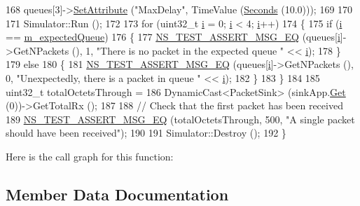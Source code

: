 \begin{DoxyCode}
168   queues[3]->\hyperlink{classns3_1_1ObjectBase_ac60245d3ea4123bbc9b1d391f1f6592f}{SetAttribute} (\textcolor{stringliteral}{"MaxDelay"}, TimeValue (\hyperlink{group__timecivil_ga33c34b816f8ff6628e33d5c8e9713b9e}{Seconds} (10.0)));
169 
170 
171   Simulator::Run ();
172 
173   \textcolor{keywordflow}{for} (uint32\_t \hyperlink{bernuolliDistribution_8m_a6f6ccfcf58b31cb6412107d9d5281426}{i} = 0; \hyperlink{bernuolliDistribution_8m_a6f6ccfcf58b31cb6412107d9d5281426}{i} < 4; \hyperlink{bernuolliDistribution_8m_a6f6ccfcf58b31cb6412107d9d5281426}{i}++)
174     \{
175       \textcolor{keywordflow}{if} (\hyperlink{bernuolliDistribution_8m_a6f6ccfcf58b31cb6412107d9d5281426}{i} == \hyperlink{classWifiAcMappingTest_a8f3ed274153f2ff1568b9fedb07a1185}{m\_expectedQueue})
176         \{
177           \hyperlink{group__testing_ga2a9d78cffb3db8e867c35fff0b698cf5}{NS\_TEST\_ASSERT\_MSG\_EQ} (queues[\hyperlink{bernuolliDistribution_8m_a6f6ccfcf58b31cb6412107d9d5281426}{i}]->GetNPackets (), 1, \textcolor{stringliteral}{"There is no packet in
       the expected queue "} << \hyperlink{bernuolliDistribution_8m_a6f6ccfcf58b31cb6412107d9d5281426}{i});
178         \}
179       \textcolor{keywordflow}{else}
180         \{
181           \hyperlink{group__testing_ga2a9d78cffb3db8e867c35fff0b698cf5}{NS\_TEST\_ASSERT\_MSG\_EQ} (queues[\hyperlink{bernuolliDistribution_8m_a6f6ccfcf58b31cb6412107d9d5281426}{i}]->GetNPackets (), 0, \textcolor{stringliteral}{"Unexpectedly, there
       is a packet in queue "} << \hyperlink{bernuolliDistribution_8m_a6f6ccfcf58b31cb6412107d9d5281426}{i});
182         \}
183     \}
184 
185   uint32\_t totalOctetsThrough =
186     DynamicCast<PacketSink> (sinkApp.\hyperlink{classns3_1_1ApplicationContainer_a9e565807abd4213a56566a7ccd8d7509}{Get} (0))->GetTotalRx ();
187 
188   \textcolor{comment}{// Check that the first packet has been received}
189   \hyperlink{group__testing_ga2a9d78cffb3db8e867c35fff0b698cf5}{NS\_TEST\_ASSERT\_MSG\_EQ} (totalOctetsThrough, 500, \textcolor{stringliteral}{"A single packet should have been
       received"});
190 
191   Simulator::Destroy ();
192 \}
\end{DoxyCode}


Here is the call graph for this function\+:




\subsection{Member Data Documentation}
